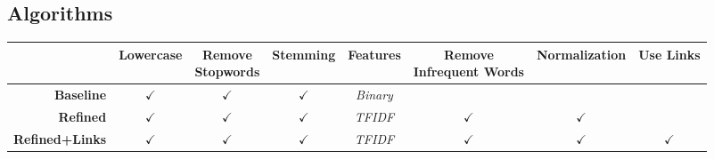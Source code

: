 \documentclass[landscape,final,a1paper,fontscale=0.45]{baposter}
\newcommand{\xmark}{\ding{55}}%
\begin{document}
\begin{poster}
{\begin{center}
  \section*{Algorithms}  
  \begin{tabular}{r|ccccccc}
  & \textbf{Lowercase} & \shortstack{\textbf{Remove} \\ \textbf{Stopwords}} & \textbf{Stemming} & \textbf{Features} & \shortstack{\textbf{Remove} \\ \textbf{Infrequent Words}} & \textbf{Normalization} & \textbf{Use Links}\\ 
\hline 
\rule{0pt}{2ex} \textbf{Baseline} & $\checkmark$ & $\checkmark$ & $\checkmark$ & \textit{Binary} & \xmark & \xmark & \xmark \\ 
\textbf{Refined} & $\checkmark$ & $\checkmark$ & $\checkmark$ & \textit{TFIDF} & $\checkmark$ & $\checkmark$ & \xmark \\ 
\textbf{Refined+Links} & $\checkmark$ & $\checkmark$ & $\checkmark$ & \textit{TFIDF} & $\checkmark$ & $\checkmark$ & $\checkmark$ \\ 
\end{tabular} 
  \end{center}
 
  }


\end{poster}
\end{document}
